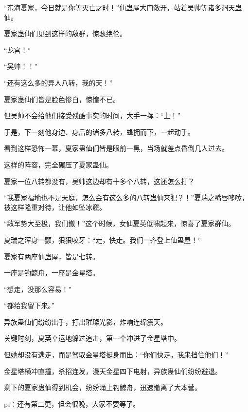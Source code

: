 \begin{this_body}
“东海夏家，今日就是你等灭亡之时！”仙蛊屋大门敞开，站着吴帅等诸多洞天蛊仙。

夏家蛊仙们见到这样的敌群，惊骇绝伦。

“龙宫！”

“吴帅！！”

“还有这么多的异人八转，我的天！”

夏家蛊仙们皆是脸色惨白，惊惶不已。

但吴帅不会给他们接受残酷事实的时间，大手一挥：“上！”

于是，下一刻他身边、身后的诸多八转，蜂拥而下，一起动手。

看到这样恐怖一幕，夏家蛊仙们皆是眼前一黑，当场就差点昏倒几人过去。

这样的阵容，完全碾压了夏家蛊仙。

夏家一位八转都没有，吴帅这边却有十多个八转，这还怎么打？

“我夏家福地也不是天庭，怎么会有这么多的八转蛊仙来犯？！”夏瑞之嘴唇哆嗦，被这样隆重对待，让他如坠冰窟。

“敌军势大至极，我们撤！”这个时候，女仙夏英低啸起来，惊喜了夏家群仙。

夏瑞之浑身一颤，狠狠咬牙：“走，快走。我们一齐登上仙蛊屋！”

夏家有两座仙蛊屋，皆是七转。

一座是钓鲸舟，一座是金星塔。

“想走，没那么容易！”

“都给我留下来。”

异族蛊仙们纷纷出手，打出璀璨光影，炸响连绵震天。

关键时刻，夏英幸运地躲过追击，第一个冲进了金星塔中。

但她却没有逃走，而是驾驭金星塔挺身而出：“你们快走，我来挡住他们！”

金星塔横冲直撞，杀招连发，漫天金星四下电射，异族蛊仙们纷纷避退。

剩下的夏家蛊仙得到机会，纷纷涌上钓鲸舟，迅速撤离了大本营。

ps：还有第二更，但会很晚，大家不要等了。

\end{this_body}

